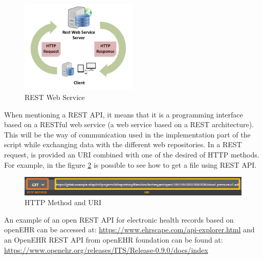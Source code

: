 \documentclass[mim_thesis.tex]{subfiles}
\begin{document}
\begin{figure}[H]
	\centering
    \includegraphics[width=0.5\textwidth]{img/rest_webservice.PNG}
	\caption{REST Web Service}
	\label{fig:rest_webservice}
\end{figure}

When mentioning a REST API, it means that it is a programming interface based on a RESTful web service (a web service based on a REST architecture). This will be the way of communication used in the implementation part of the script while exchanging data with the different web repositories. In a REST request, is provided an \ac{URI} combined with one of the desired of HTTP methods. For example, in the figure \ref{fig:URI_methods} is possible to see how to get a file using REST API.  

\begin{figure}[H]
	\centering
    \includegraphics[width=1.05\textwidth]{img/URI_methods.PNG}
	\caption{HTTP Method and URI}
	\label{fig:URI_methods}
\end{figure}

An example of an open REST API for electronic health records based on openEHR can be accessed at: \url{https://www.ehrscape.com/api-explorer.html} and an OpenEHR REST API from openEHR foundation can be found at: \url{https://www.openehr.org/releases/ITS/Release-0.9.0/docs/index}

\newpage 
\end{document}
